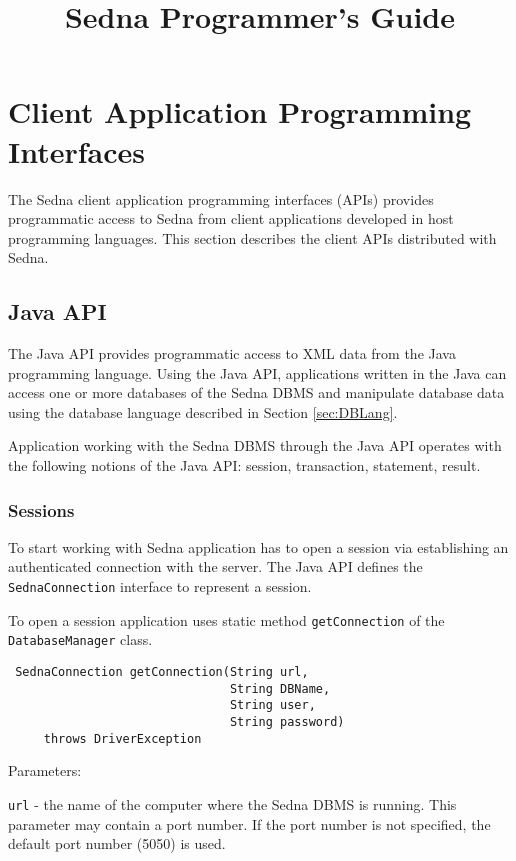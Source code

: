 \documentclass[a4paper,12pt]{article}
\title{Sedna Programmer's Guide}
\date{}
\newcommand{\TocAt}[6]{}   %
\begin{document}
\sloppy
\maketitle

\TocAt*{section,subsection,subsubsection}
\TocAt*{subsection,subsubsection}

\tableofcontents
\newpage

\section{Client Application Programming Interfaces}
The Sedna client application programming interfaces (APIs) provides programmatic
access to Sedna from client applications developed in host programming
languages. This section describes the client APIs distributed with Sedna.

\subsection{Java API}
The Java API provides programmatic access to XML data from the Java programming
language. Using the Java API, applications written in the Java can access one or
more databases of the Sedna DBMS and manipulate database data using the database
language described in Section \ref{sec:DBLang}.

Application working with the Sedna DBMS through the Java API operates with the
following notions of the Java API: session, transaction, statement, result.

\subsubsection{Sessions}
To start working with Sedna application has to open a session via establishing
an authenticated connection with the server. The Java API defines the
\verb!SednaConnection! interface to represent a session.

To open a session application uses static method \verb!getConnection! of the
\verb!DatabaseManager! class.

\small{
\begin{verbatim}
 SednaConnection getConnection(String url,
                               String DBName,
                               String user,
                               String password)
     throws DriverException
\end{verbatim}
}

Parameters:

\verb!url! - the name of the computer where the Sedna DBMS is running. This
parameter may contain a port number. If the port number is not specified, the
default port number (5050) is used.
\end{document}

